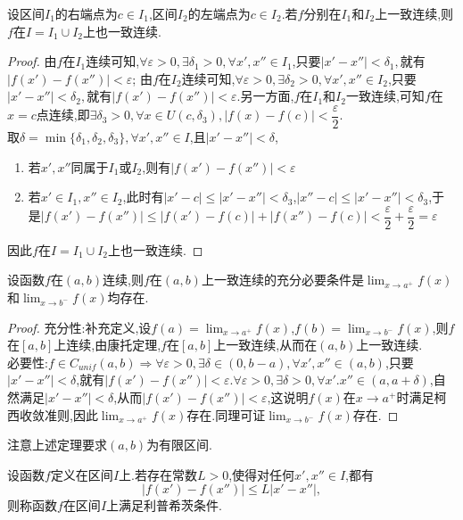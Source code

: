 \begin{theorem}
    设区间$I_1$的右端点为$c\in I_1$,区间$I_2$的左端点为$c\in I_2$.若$f$分别在$I_1$和$I_2$上一致连续,则$f$在$I=I_1\cup I_2$上也一致连续.
\end{theorem}
\begin{proof}
    由$f$在$I_1$连续可知,$\forall\varepsilon>0,\exists\delta_1>0,\forall x',x''\in I_1$,只要$|x'-x''|<\delta_1,$就有$|f(x')-f(x'')|<\varepsilon$;
    由$f$在$I_2$连续可知,$\forall\varepsilon>0,\exists\delta_2>0,\forall x',x''\in I_2$,只要$|x'-x''|<\delta_2,$就有$|f(x')-f(x'')|<\varepsilon$.另一方面,$f$在$I_1$和$I_2$一致连续,可知$f$在$x=c$点连续,即$\displaystyle\exists\delta_3>0,\forall x\in U(c,\delta_3),|f(x)-f(c)|<\dfrac{\varepsilon}{2}$.\\
    取$\delta=\min\{\delta_1,\delta_2,\delta_3\},\forall x',x''\in I$,且$|x'-x''|<\delta$,
    \begin{enumerate}
        \item 若$x',x''$同属于$I_1$或$I_2$,则有$|f(x')-f(x'')|<\varepsilon$
        \item 若$x'\in I_1,x''\in I_2$,此时有$|x'-c|\leq |x'-x''|<\delta_3$,$|x''-c|\leq |x'-x''|<\delta_3$,于是$\displaystyle|f(x')-f(x'')|\leq |f(x')-f(c)|+|f(x'')-f(c)|<\dfrac{\varepsilon}{2}+\dfrac{\varepsilon}{2}=\varepsilon$
    \end{enumerate}
    因此$f$在$I=I_1\cup I_2$上也一致连续.
\end{proof}
\begin{theorem}
    设函数$f$在$(a,b)$连续,则$f$在$(a,b)$上一致连续的充分必要条件是$\displaystyle\lim_{x\to a^+} f(x)$和$\displaystyle\lim_{x\to b^-} f(x)$均存在.
\end{theorem}
\begin{proof}
    充分性:补充定义,设$f(a)=\displaystyle\lim_{x\to a^+} f(x)$,$f(b)=\displaystyle\lim_{x\to b^-} f(x)$,则$f$在$[a,b]$上连续,由康托定理,$f$在$[a,b]$上一致连续,从而在$(a,b)$上一致连续.\\
    必要性:$f\in C_{unif}(a,b)\Longrightarrow\forall\varepsilon>0,\exists\delta\in(0,b-a),\forall x',x''\in(a,b)$,只要$|x'-x''|<\delta$,就有$|f(x')-f(x'')|<\varepsilon$.$\forall\varepsilon>0,\exists\delta>0,\forall x'.x''\in(a,a+\delta)$,自然满足$|x'-x''|<\delta$,从而$|f(x')-f(x'')|<\varepsilon$,这说明$f(x)$在$x\to a^+$时满足柯西收敛准则,因此$\displaystyle\lim_{x\to a^+} f(x)$存在.同理可证$\displaystyle\lim_{x\to b^-} f(x)$存在.
\end{proof}
注意上述定理要求$(a,b)$为有限区间.
\begin{definition}
    设函数$f$定义在区间$I$上.若存在常数$L>0$,使得对任何$x',x''\in I$,都有
    \begin{equation*}
        |f(x')-f(x'')|\leq L|x'-x''|,
    \end{equation*}
    则称函数$f$在区间$I$上满足利普希茨条件.
\end{definition}
